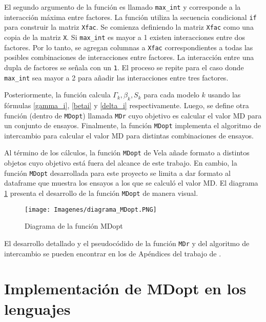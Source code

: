 El segundo argumento de la función es llamado \texttt{max\_int} y corresponde a la interacción máxima entre factores. La función utiliza la secuencia condicional \texttt{if} para construir la matriz \texttt{Xfac}. Se comienza definiendo la matriz \texttt{Xfac} como una copia de la matriz \texttt{X}. Si \texttt{max\_int} es mayor a 1 existen interacciones entre dos factores. Por lo tanto, se agregan columnas a \texttt{Xfac} correspondientes a todas las posibles combinaciones de interacciones entre factores. La interacción entre una dupla de factores se señala con un \texttt{1}. El proceso se repite para el caso donde \texttt{max\_int} sea mayor a 2 para añadir las interacciones entre tres factores. 

Posteriormente, la función calcula $\Gamma_k, \beta_k, S_k$ para cada modelo $k$ usando las fórmulas \ref{gamma_i}, \ref{betai} y \ref{delta_i} respectivamente. Luego, se define otra función (dentro de \texttt{MDopt}) llamada \texttt{MDr} cuyo objetivo es calcular el valor MD para un conjunto de ensayos. Finalmente, la función \texttt{MDopt} implementa el algoritmo de intercambio para calcular el valor MD para distintas combinaciones de ensayos.

Al término de los cálculos, la función \texttt{MDopt} de Vela añade formato a distintos objetos cuyo objetivo está fuera del alcance de este trabajo. En cambio, la función \texttt{MDopt} desarrollada para este proyecto se limita a dar formato al dataframe que muestra los ensayos a los que se calculó el valor MD. El diagrama \ref{diagrama_mdopt} presenta el desarrollo de la función \texttt{MDopt} de manera visual. 

\begin{figure}[h]
	\begin{center} 
		\texttt{[image: Imagenes/diagrama\_MDopt.PNG]}
		\caption{Diagrama de la función MDopt}
		\label{diagrama_mdopt}
	\end{center}
\end{figure} 

El desarrollo detallado y el pseudocódido de la función \texttt{MDr} y del algoritmo de intercambio se pueden encontrar en los de Apéndices del trabajo de \cite{tesis_paty}.  

\section{Implementación de MDopt en los lenguajes}

